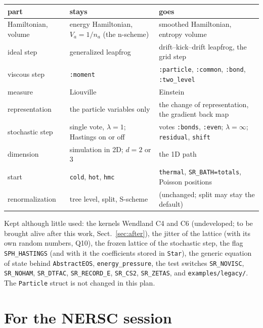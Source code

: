 \documentclass[11pt,aps,preprint,nofootinbib,superscriptaddress,tightenlines]{revtex4-2}
\def\Sect#1{Sect.~\ref{#1}}
\begin{document}
\begin{center}
\small
\begin{tabular}{p{}p{}p{}}
\toprule
part & stays & goes \\
\midrule
Hamiltonian, volume & energy Hamiltonian, $V_a=1/n_a$ (the n-scheme) & smoothed Hamiltonian, entropy volume \\
ideal step & generalized leapfrog & drift--kick--drift leapfrog, the grid step \\
viscous step & \texttt{:moment} & \texttt{:particle}, \texttt{:common}, \texttt{:bond}, \texttt{:two\_level} \\
measure & Liouville & Einstein \\
representation & the particle variables only & the change of representation, the gradient back map \\
stochastic step & single vote, $\lambda=1$; Hastings on or off & votes \texttt{:bonds}, \texttt{:even}; $\lambda=\infty$; \texttt{residual}, \texttt{shift} \\
dimension & simulation in 2D; $d=2$ or 3 & the 1D path \\
start & \texttt{cold}, \texttt{hot}, \texttt{hmc} & \texttt{thermal}, \texttt{SR\_BATH=totals}, Poisson positions \\
renormal\-ization & tree level, split, S-scheme & (unchanged; split may stay the default) \\
\bottomrule
\end{tabular}
\end{center}

Kept although little used: the kernels Wendland C4 and C6 (undeveloped; to be brought alive after this work, \Sect{sec:after}), the jitter of
the lattice (with its own random numbers, Q10), the frozen lattice of the stochastic step, the flag \texttt{SPH\_HASTINGS} (and with it the
coefficients stored in \texttt{Star}), the generic equation of state behind \texttt{AbstractEOS}, \texttt{energy\_pressure}, the test switches
\texttt{SR\_NOVISC}, \texttt{SR\_NOHAM}, \texttt{SR\_DTFAC}, \texttt{SR\_RECORD\_E}, \texttt{SR\_CS2}, \texttt{SR\_ZETAS}, and
\nolinkurl{examples/legacy/}.  The \texttt{Particle} struct is not changed in this plan.

\section{For the NERSC session}
\label{sec:nersc}
\end{document}
